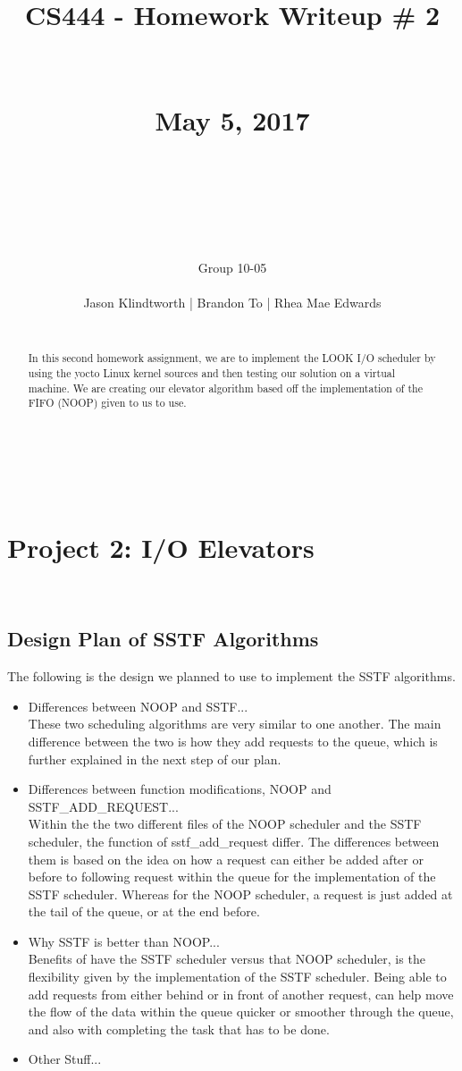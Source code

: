 \documentclass[10pt,journal,onecolumn,compsoc]{IEEEtran}
\title{CS444 - Homework Writeup \# 2 \\ ~ \\ ~ \\ May 5, 2017 \\ ~ \\ ~ \\ ~ \\}
\author{\huge Group 10-05\\ ~ \\Jason Klindtworth | Brandon To | Rhea Mae Edwards\\ ~ \\}
\begin{document}
\maketitle
~ \\ ~

\begin{abstract}

\noindent

In this second homework assignment, we are to implement the LOOK I/O scheduler by using the yocto Linux kernel sources and then testing our solution on a virtual machine. We are creating our elevator algorithm based off the implementation of the FIFO (NOOP) given to us to use.

\end{abstract}

\newpage
{}

\section*{\textbf{Project 2: I/O Elevators}} ~

\subsection{\textbf{Design Plan of SSTF Algorithms}}
The following is the design we planned to use to implement the SSTF algorithms.

\begin{itemize}
\item {Differences between NOOP and SSTF... \\
These two scheduling algorithms are very similar to one another. The main difference between the two is how they add requests to the queue, which is further explained in the next step of our plan.} \\
\item {Differences between function modifications, NOOP and SSTF\_ADD\_REQUEST... \\
Within the the two different files of the NOOP scheduler and the SSTF scheduler, the function of sstf\_add\_request differ. The differences between them is based on the idea on how a request can either be added after or before to following request within the queue for the implementation of the SSTF scheduler. Whereas for the NOOP scheduler, a request is just added at the tail of the queue, or at the end before.} \\
\item {Why SSTF is better than NOOP... \\
Benefits of have the SSTF scheduler versus that NOOP scheduler, is the flexibility given by the implementation of the SSTF scheduler. Being able to add requests from either behind or in front of another request, can help move the flow of the data within the queue quicker or smoother through the queue, and also with completing the task that has to be done.} \\
\item {Other Stuff...} 
\end{itemize}
\end{document}

